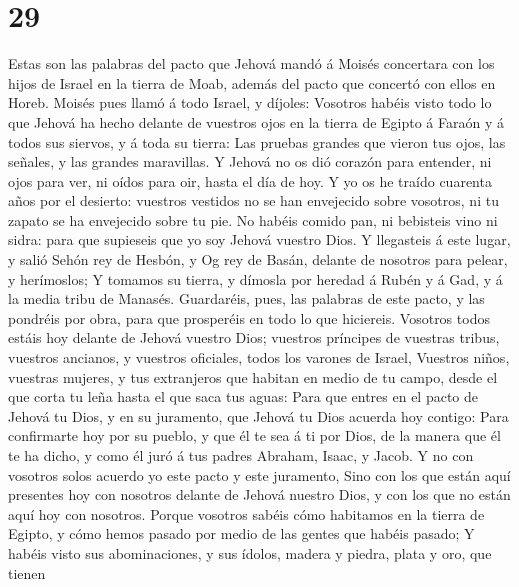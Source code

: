 \hypertarget{section-28}{%
\section{29}\label{section-28}}

 Estas son las palabras del pacto que Jehová mandó á
Moisés concertara con los hijos de Israel en la tierra de Moab, además
del pacto que concertó con ellos en Horeb.  Moisés pues
llamó á todo Israel, y díjoles: Vosotros habéis visto todo lo que Jehová
ha hecho delante de vuestros ojos en la tierra de Egipto á Faraón y á
todos sus siervos, y á toda su tierra:  Las pruebas
grandes que vieron tus ojos, las señales, y las grandes maravillas.
 Y Jehová no os dió corazón para entender, ni ojos para
ver, ni oídos para oir, hasta el día de hoy.  Y yo os he
traído cuarenta años por el desierto: vuestros vestidos no se han
envejecido sobre vosotros, ni tu zapato se ha envejecido sobre tu pie.
 No habéis comido pan, ni bebisteis vino ni sidra: para
que supieseis que yo soy Jehová vuestro Dios.  Y
llegasteis á este lugar, y salió Sehón rey de Hesbón, y Og rey de Basán,
delante de nosotros para pelear, y herímoslos;  Y tomamos
su tierra, y dímosla por heredad á Rubén y á Gad, y á la media tribu de
Manasés.  Guardaréis, pues, las palabras de este pacto, y
las pondréis por obra, para que prosperéis en todo lo que hiciereis.
 Vosotros todos estáis hoy delante de Jehová vuestro
Dios; vuestros príncipes de vuestras tribus, vuestros ancianos, y
vuestros oficiales, todos los varones de Israel, 
Vuestros niños, vuestras mujeres, y tus extranjeros que habitan en medio
de tu campo, desde el que corta tu leña hasta el que saca tus aguas:
 Para que entres en el pacto de Jehová tu Dios, y en su
juramento, que Jehová tu Dios acuerda hoy contigo:  Para
confirmarte hoy por su pueblo, y que él te sea á ti por Dios, de la
manera que él te ha dicho, y como él juró á tus padres Abraham, Isaac, y
Jacob.  Y no con vosotros solos acuerdo yo este pacto y
este juramento,  Sino con los que están aquí presentes
hoy con nosotros delante de Jehová nuestro Dios, y con los que no están
aquí hoy con nosotros.  Porque vosotros sabéis cómo
habitamos en la tierra de Egipto, y cómo hemos pasado por medio de las
gentes que habéis pasado;  Y habéis visto sus
abominaciones, y sus ídolos, madera y piedra, plata y oro, que tienen
